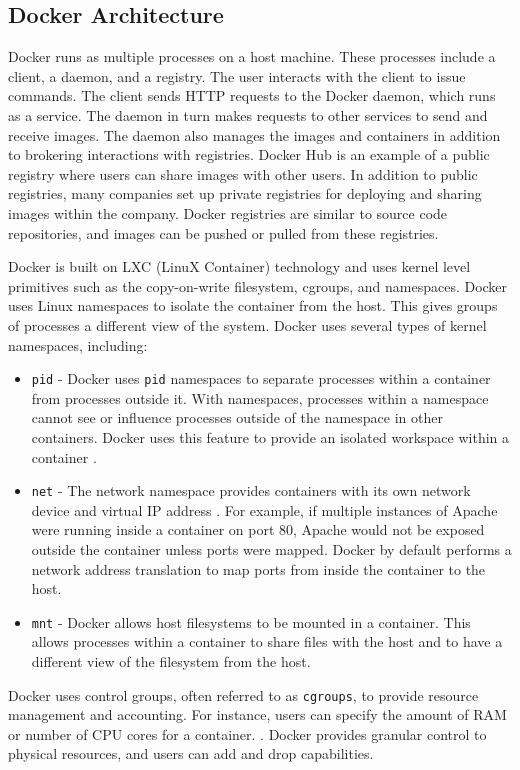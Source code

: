 \documentclass[11pt]{article}
\begin{document}
\subsection{Docker Architecture}
Docker runs as multiple processes on a host machine. These processes include a client, a daemon, and a registry. The user interacts with the client to issue commands. The client sends HTTP requests to the Docker daemon, which runs as a service. The daemon in turn makes requests to other services to send and receive images. The daemon also manages the images and containers in addition to brokering interactions with registries. Docker Hub is an example of a public registry where users can share images with other users. In addition to public registries, many companies set up private registries for deploying and sharing images within the company. Docker registries are similar to source code repositories, and images can be pushed or pulled from these registries.

Docker is built on LXC (LinuX Container) technology \cite{merkel} and uses kernel level primitives such as the copy-on-write filesystem, cgroups, and namespaces. Docker uses Linux namespaces to isolate the container from the host. This gives groups of processes a different view of the system. Docker uses several types of kernel namespaces, including:
\begin{itemize}
	\item \texttt{pid} - Docker uses \texttt{pid} namespaces to separate processes within a container from processes outside it. With namespaces, processes within a namespace cannot see or influence processes outside of the namespace in other containers. Docker uses this feature to provide an isolated workspace within a container \cite{rosen}.
	\item \texttt{net} - The network namespace provides containers with its own network device and virtual IP address \cite{anderson}. For example, if multiple instances of Apache were running inside a container on port 80, Apache would not be exposed outside the container unless ports were mapped. Docker by default performs a network address translation to map ports from inside the container to the host.
	\item \texttt{mnt} - Docker allows host filesystems to be mounted in a container. This allows processes within a container to share files with the host and to have a different view of the filesystem from the host.
\end{itemize}

Docker uses control groups, often referred to as \texttt{cgroups}, to provide resource management and accounting. For instance, users can specify the amount of RAM or number of CPU cores for a container. \cite{anderson}. Docker provides granular control to physical resources, and users can add and drop capabilities.
\end{document}
